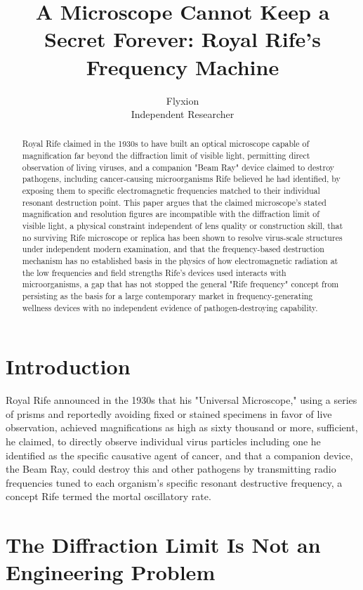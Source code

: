 \documentclass[11pt]{article}
\title{A Microscope Cannot Keep a Secret Forever: Royal Rife's Frequency Machine}
\author{Flyxion \\ \small Independent Researcher}
\date{}
\begin{document}
\maketitle

\begin{abstract}
Royal Rife claimed in the 1930s to have built an optical microscope capable of magnification far beyond the diffraction limit of visible light, permitting direct observation of living viruses, and a companion "Beam Ray" device claimed to destroy pathogens, including cancer-causing microorganisms Rife believed he had identified, by exposing them to specific electromagnetic frequencies matched to their individual resonant destruction point. This paper argues that the claimed microscope's stated magnification and resolution figures are incompatible with the diffraction limit of visible light, a physical constraint independent of lens quality or construction skill, that no surviving Rife microscope or replica has been shown to resolve virus-scale structures under independent modern examination, and that the frequency-based destruction mechanism has no established basis in the physics of how electromagnetic radiation at the low frequencies and field strengths Rife's devices used interacts with microorganisms, a gap that has not stopped the general "Rife frequency" concept from persisting as the basis for a large contemporary market in frequency-generating wellness devices with no independent evidence of pathogen-destroying capability.
\end{abstract}

\section{Introduction}

Royal Rife announced in the 1930s that his "Universal Microscope," using a series of prisms and reportedly avoiding fixed or stained specimens in favor of live observation, achieved magnifications as high as sixty thousand or more, sufficient, he claimed, to directly observe individual virus particles including one he identified as the specific causative agent of cancer, and that a companion device, the Beam Ray, could destroy this and other pathogens by transmitting radio frequencies tuned to each organism's specific resonant destructive frequency, a concept Rife termed the mortal oscillatory rate.

\section{The Diffraction Limit Is Not an Engineering Problem}
\end{document}
